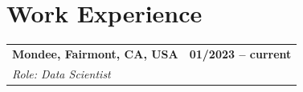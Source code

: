 \documentclass[11pt,letterpaper]{article}
\begin{document}
\vspace{-20pt}
\section*{Work Experience}
\vspace{-20pt}

\noindent
\begin{tabularx}{\linewidth}{@{}X r@{}}
  \textbf{Mondee, Fairmont, CA, USA} & \textbf{01/2023 -- current}\\
  \textit{Role: Data Scientist} &
\end{tabularx}
\end{document}
